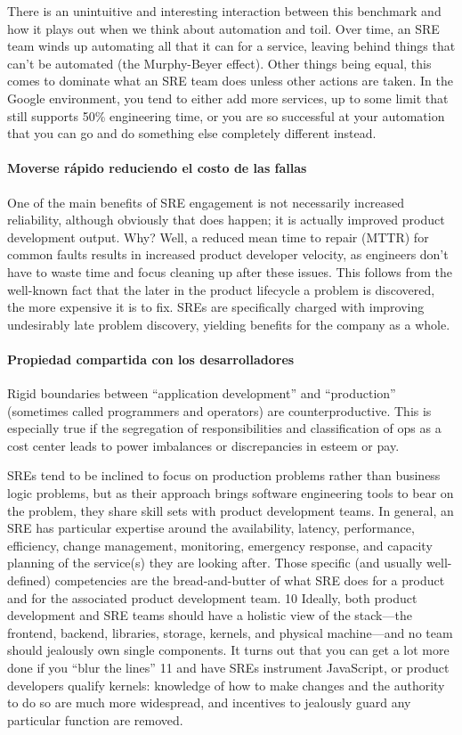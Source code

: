 There is an unintuitive and interesting interaction between this benchmark and how it plays out when we think about automation and toil. Over time, an SRE team winds up automating all that it can for a service, leaving behind things that can’t be automated (the Murphy-Beyer effect). Other things being equal, this comes to dominate what an SRE team does unless other actions are taken. In the Google environment, you tend to either add more services, up to some limit that still supports 50\% engineering time, or you are so successful at your automation that you can go and do something else completely different instead.

\paragraph{Moverse rápido reduciendo el costo de las fallas}

One of the main benefits of SRE engagement is not necessarily increased reliability, although obviously that does happen; it is actually improved product development output. Why? Well, a reduced mean time to repair (MTTR) for common faults results in increased product developer velocity, as engineers don’t have to waste time and focus cleaning up after these issues. This follows from the well-known fact that the later in the product lifecycle a problem is discovered, the more expensive it is to fix. SREs are specifically charged with improving undesirably late problem discovery, yielding benefits for the company as a whole.

\paragraph{Propiedad compartida con los desarrolladores}

Rigid boundaries between “application development” and “production” (sometimes called programmers and operators) are counterproductive. This is especially true if the segregation of responsibilities and classification of ops as a cost center leads to power imbalances or discrepancies in esteem or pay.

SREs tend to be inclined to focus on production problems rather than business logic problems, but as their approach brings software engineering tools to bear on the problem, they share skill sets with product development teams. In general, an SRE has particular expertise around the availability, latency, performance, efficiency, change management, monitoring, emergency response, and capacity planning of the service(s) they are looking after. Those specific (and usually well-defined) competencies are the bread-and-butter of what SRE does for a product and for the associated product development team. 10 Ideally, both product development and SRE teams should have a holistic view of the stack—the frontend, backend, libraries, storage, kernels, and physical machine—and no team should jealously own single components. It turns out that you can get a lot more done if you “blur the lines” 11 and have SREs instrument JavaScript, or product developers qualify kernels: knowledge of how to make changes and the authority to do so are much more widespread, and incentives to jealously guard any particular function are removed.

